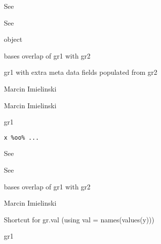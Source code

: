 \documentclass[a4paper]{book}
\begin{document}
%
\begin{Arguments}
\begin{ldescription}
\item[\code{x}] See 

\item[\code{...}] See 

\item[\code{x}]  object
\end{ldescription}
\end{Arguments}
%
\begin{Value}
bases overlap of gr1 with gr2

gr1 with extra meta data fields populated from gr2
\end{Value}
%
\begin{Author}\relax
Marcin Imielinski

Marcin Imielinski
\end{Author}
%
\begin{Description}\relax
gr1 
\end{Description}
%
\begin{Usage}
\begin{verbatim}
x %oo% ...
\end{verbatim}
\end{Usage}
%
\begin{Arguments}
\begin{ldescription}
\item[\code{x}] See 

\item[\code{...}] See 
\end{ldescription}
\end{Arguments}
%
\begin{Value}
bases overlap  of gr1 with gr2
\end{Value}
%
\begin{Author}\relax
Marcin Imielinski
\end{Author}
%
\begin{Description}\relax
Shortcut for gr.val (using val = names(values(y)))

gr1 
\end{Description}
\end{document}
